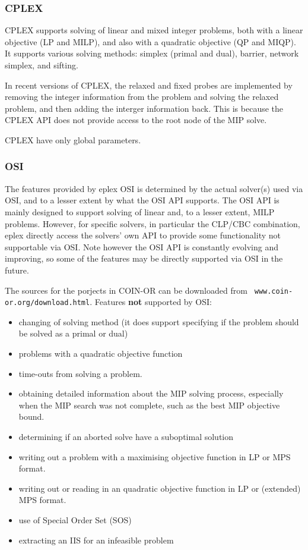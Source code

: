 \subsubsection{CPLEX}
CPLEX supports solving of linear and mixed integer problems, both with a
linear objective (LP and MILP), and also with a quadratic objective (QP and
MIQP). It supports various solving methods: simplex (primal and dual),
barrier, network simplex, and sifting. 

In recent versions of CPLEX, the relaxed and fixed probes are implemented 
by removing
the integer information from the problem and solving the relaxed problem,
and then adding the interger information back. This is because the CPLEX
API does not provide access to the root node of the MIP solve.

CPLEX have only global parameters.
  
\subsubsection{OSI}
The features provided by eplex OSI is determined by the actual
solver(s) used via OSI, and to a lesser extent by what the OSI API
supports. The OSI API is mainly designed to support solving of 
linear and, to a lesser extent, MILP problems. However, for specific
solvers, in particular the CLP/CBC combination, eplex
directly access the solvers' own API to provide some functionality not
supportable via OSI. Note however the OSI API is constantly evolving and
improving, so some of the features may be directly supported via OSI in the
future. 

The sources for the porjects in COIN-OR can be downloaded from {\tt
www.coin-or.org/download.html}. 
Features {\bf not} supported by OSI: 
\begin{itemize}
\item changing of solving method (it does support specifying if the problem
should be solved as a primal or dual)
\item problems with a quadratic objective function
\item time-outs from solving a problem.
\item obtaining detailed information about the MIP solving process,
especially when the MIP search was not complete, such as
the best MIP objective bound.
\item determining if an aborted solve have a suboptimal solution 
\item writing out a problem with a maximising objective function in LP or
MPS format.
\item writing out or reading in an quadratic objective function in LP or (extended)
MPS format.
\item use of Special Order Set (SOS)
\item extracting an IIS for an infeasible problem
\end{itemize}

